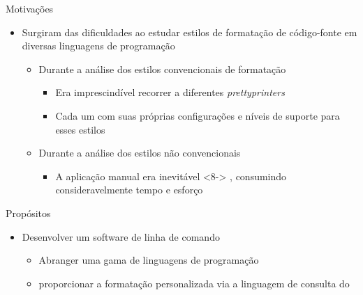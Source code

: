 \documentclass
  [ aspectratio=169,
    english,
    hyperref={citecolor=blue,colorlinks=true,linkcolor=blue,urlcolor=blue},
    brazil]
  {beamer}
\title{\witchcooking}
\subtitle{\witchcookingsubtitle}
\author{Átila Gama Silva}
\date{\today}
\begin{document}
  \begin{frame}\titlepage\end{frame}

  \begin{frame}{Motivações}
    \begin{itemize}
      \item<2-> Surgiram das dificuldades ao estudar estilos de formatação de
                código-fonte em diversas linguagens de programação
                \begin{itemize}
                  \item<3-> Durante a análise dos estilos convencionais de
                            formatação
                            \begin{itemize}
                              \item<4-> Era imprescindível recorrer a
                                        diferentes \textit{prettyprinters}
                              \item<5-> Cada um com suas próprias configurações
                                        e níveis de suporte para esses estilos
                            \end{itemize}
                  \item<6-> Durante a análise dos estilos não convencionais
                            \begin{itemize}
                              \item<7-> A aplicação manual era inevitável%
                                        \onslide
                                          <8->
                                          {%
                                            , consumindo consideravelmente tempo
                                            e esforço}
                            \end{itemize}
                \end{itemize}
    \end{itemize}
  \end{frame}

  \begin{frame}{Propósitos}
    \begin{itemize}
      \item<2-> Desenvolver um software de linha de comando%
                \begin{itemize}
                  \item<6-> Abranger uma gama de linguagens de programação
                  \item<7-> proporcionar a formatação personalizada via a
                            linguagem de consulta do \treesitter
                \end{itemize}
    \end{itemize}
  \end{frame}
\end{document}
